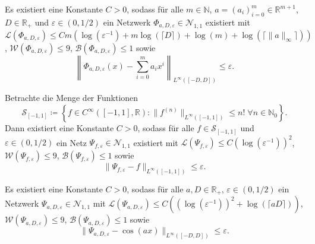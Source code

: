 \documentclass[11pt]{scrartcl}
\newcommand{\N}{\mathbb{N}} %
\newcommand{\R}{\mathbb{R}} %
\newcommand{\norm}[1]{\| #1 \|}
\begin{document}
\begin{proposition} %
    \newcommand{\Phia}{\Phi_{a,D,\varepsilon}}
    Es existiert eine Konstante \(C>0\), sodass für alle \(m\in \N\), \(a = (a_i)_{i=0}^m \in \R^{m+1}\), 
    \(D\in \R_+\) und \(\varepsilon \in (0,1/2)\) ein Netzwerk \(\Phia \in \mathcal{N}_{1,1}\) 
    existiert mit \(\mathcal{L}(\Phia) \leq C m (\log(\varepsilon^{-1}) + m\log(\lceil D \rceil) + \log(m) + \log(\lceil \norm{a}_\infty \rceil))\), 
    \(\mathcal{W}(\Phia) \leq 9\), \(\mathcal{B}(\Phia) \leq 1\) sowie 
    \[ \left\|\Phia(x) - \sum_{i=0}^m a_i x^i \right\|_{L^\infty([-D,D])} \leq \varepsilon. \]
\end{proposition}

\begin{lemma} %
    Betrachte die Menge der Funktionen 
    \[ \mathcal{S}_{[-1,1]} \coloneqq \left\{ f \in C^\infty([-1,1], \R): \norm{f^{(n)}}_{L^\infty([-1,1])} \leq n! \;\forall n \in \N_0 \right\}. \]
    Dann existiert eine Konstante \(C>0\), sodass für alle \(f\in \mathcal{S}_{[-1,1]}\) und \(\varepsilon\in (0,1/2)\) 
    ein Netz \(\Psi_{f,\varepsilon} \in \mathcal{N}_{1,1}\) existiert mit 
    \( \mathcal{L}(\Psi_{f,\varepsilon}) \leq C(\log(\varepsilon^{-1}))^2 \), 
    \(\mathcal{W}(\Psi_{f,\varepsilon}) \leq 9\), \(\mathcal{B}(\Psi_{f,\varepsilon}) \leq 1\) 
    sowie 
    \[ \norm{\Psi_{f,\varepsilon} - f}_{L^\infty([-1,1])} \leq \varepsilon. \]
\end{lemma}

\begin{theorem} %
    \newcommand{\Psia}{\Psi_{a,D,\varepsilon}}
    Es existiert eine Konstante \(C>0\), sodass für alle \(a,D\in \R_+\), \(\varepsilon \in (0,1/2)\) 
    ein Netzwerk \(\Psia \in \mathcal{N}_{1,1}\) mit \(\mathcal{L}(\Psia) \leq C((\log(\varepsilon^{-1}))^2 + \log(\lceil aD\rceil))\), 
    \(\mathcal{W}(\Psia) \leq 9\), \(\mathcal{B}(\Psia) \leq 1\) sowie 
    \[ \norm{\Psia - \cos(a x) }_{L^{\infty}([-D,D])} \leq \varepsilon. \]
\end{theorem}

\nocite{Grohs2019}
\printbibliography{}
\end{document}
